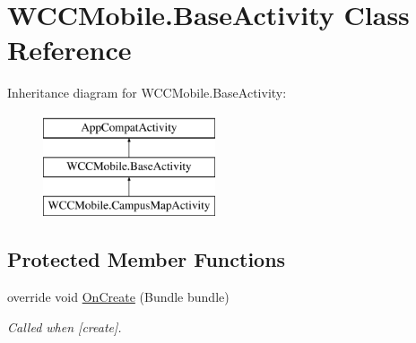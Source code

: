\hypertarget{class_w_c_c_mobile_1_1_base_activity}{}\section{W\+C\+C\+Mobile.\+Base\+Activity Class Reference}
\label{class_w_c_c_mobile_1_1_base_activity}
Inheritance diagram for W\+C\+C\+Mobile.\+Base\+Activity\+:\begin{figure}[H]
\begin{center}
\leavevmode
\includegraphics[height=3.000000cm]{class_w_c_c_mobile_1_1_base_activity}
\end{center}
\end{figure}
\subsection*{Protected Member Functions}
\begin{DoxyCompactItemize}
\item 
override void \hyperlink{class_w_c_c_mobile_1_1_base_activity_a19bcbf31bee5a7281a320ac674da97de}{On\+Create} (Bundle bundle)
\begin{DoxyCompactList}\small\item\em Called when \mbox{[}create\mbox{]}. \end{DoxyCompactList}\end{DoxyCompactItemize}
